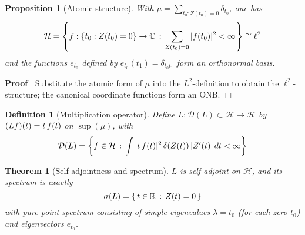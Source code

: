 \documentclass{article}
\newenvironment{proof}{\noindent\textbf{Proof\ }}{\hspace*{\fill}$\Box$\medskip}
\newtheorem{definition}{Definition}
\newtheorem{proposition}{Proposition}
{\theorembodyfont{\rmfamily}\newtheorem{remark}{Remark}}
\newtheorem{theorem}{Theorem}
\begin{document}
\begin{proposition}
  [Atomic structure] With $\mu = \sum_{t_0 : Z (t_0) = 0} \delta_{t_0}$, one
  has
  \begin{equation}
    \mathcal{H}= \left\{ f : \{t_0 : Z (t_0) = 0\} \to \mathbb{C}
    \hspace{0.17em} : \hspace{0.17em} \sum_{Z (t_0) = 0} |f (t_0) |^2 < \infty
    \right\} \cong \ell^2
  \end{equation}
  and the functions $e_{t_0}$ defined by $e_{t_0} (t_1) = \delta_{t_0 t_1}$
  form an orthonormal basis.
\end{proposition}

\begin{proof}
  Substitute the atomic form of $\mu$ into the $L^2$-definition to obtain the
  $\ell^2$-structure; the canonical coordinate functions form an ONB.
\end{proof}

\begin{definition}
  [Multiplication operator] Define $L : \mathcal{D} (L) \subset \mathcal{H}
  \to \mathcal{H}$ by $(Lf) (t) = t \hspace{0.17em} f (t)$ on $\sup (\mu)$,
  with
  \begin{equation}
    \mathcal{D} (L) = \left\{ f \in \mathcal{H} \hspace{0.17em} :
    \hspace{0.17em} \int |t \hspace{0.17em} f (t) |^2  \hspace{0.17em} \delta
    (Z (t)) \hspace{0.17em} |Z' (t) | \hspace{0.17em} dt < \infty \right\}
  \end{equation}
\end{definition}

\begin{theorem}
  [Self-adjointness and spectrum] $L$ is self-adjoint on $\mathcal{H}$, and
  its spectrum is exactly
  \begin{equation}
    \sigma (L) = \{ \hspace{0.17em} t \in \mathbb{R} \hspace{0.17em} :
    \hspace{0.17em} Z (t) = 0 \hspace{0.17em} \}
  \end{equation}
  with pure point spectrum consisting of simple eigenvalues $\lambda = t_0$
  (for each zero $t_0$) and eigenvectors $e_{t_0}$.
\end{theorem}
\end{document}
